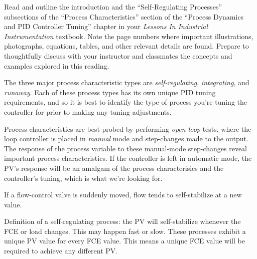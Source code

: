 

Read and outline the introduction and the ``Self-Regulating Processes'' subsections of the ``Process Characteristics'' section of the ``Process Dynamics and PID Controller Tuning'' chapter in your {\it Lessons In Industrial Instrumentation} textbook.  Note the page numbers where important illustrations, photographs, equations, tables, and other relevant details are found.  Prepare to thoughtfully discuss with your instructor and classmates the concepts and examples explored in this reading.














The three major process characteristic types are {\it self-regulating}, {\it integrating}, and {\it runaway}.  Each of these process types has its own unique PID tuning requirements, and so it is best to identify the type of process you're tuning the controller for prior to making any tuning adjustments.

Process characteristics are best probed by performing {\it open-loop} tests, where the loop controller is placed in {\it manual} mode and step-changes made to the output.  The response of the process variable to these manual-mode step-changes reveal important process characteristics.  If the controller is left in automatic mode, the PV's response will be an amalgam of the process characterisics and the controller's tuning, which is  what we're looking for.  


\vskip 10pt


If a flow-control valve is suddenly moved, flow tends to self-stabilize at a new value.

\vskip 10pt

Definition of a self-regulating process: the PV will self-stabilize whenever the FCE or load changes.  This may happen fast or slow.  These processes exhibit a unique PV value for every FCE value.  This means a unique FCE value will be required to achieve any different PV.

